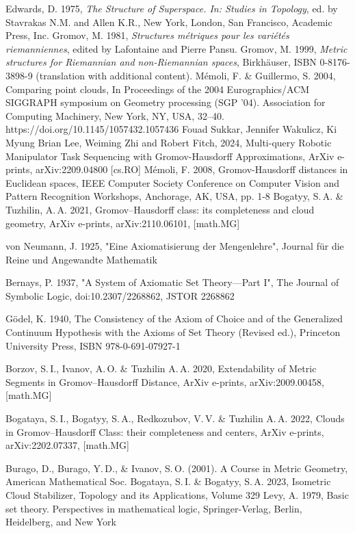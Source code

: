 \documentclass[11pt,twoside,draft
]{article}
\begin{document}
\begin{engbibliography}{99}
    
     Edwards, D. 1975, \emph{The Structure of Superspace. In: Studies in Topology}, ed. by Stavrakas N.M. and Allen K.R., New York, London, San Francisco, Academic Press, Inc.
 Gromov, M. 1981, \emph{Structures m\'etriques pour les vari\'et\'es riemanniennes}, edited by Lafontaine and Pierre Pansu.
 Gromov, M. 1999, \emph{Metric structures for Riemannian and non-Riemannian spaces}, Birkh\"auser, ISBN 0-8176-3898-9 (translation with additional content).
Mémoli, F. \& Guillermo, S. 2004, Comparing point clouds, In Proceedings of the 2004 Eurographics/ACM SIGGRAPH symposium on Geometry processing (SGP '04). Association for Computing Machinery, New York, NY, USA, 32–40. https://doi.org/10.1145/1057432.1057436
 Fouad Sukkar, Jennifer Wakulicz, Ki Myung Brian Lee, Weiming Zhi and Robert Fitch, 2024, Multi-query Robotic Manipulator Task Sequencing with Gromov-Hausdorff Approximations, ArXiv e-prints,
arXiv:2209.04800 [cs.RO]
Mémoli, F. 2008, Gromov-Hausdorff distances in Euclidean spaces, IEEE Computer Society Conference on Computer Vision and Pattern Recognition Workshops, Anchorage, AK, USA, pp. 1-8
Bogatyy, S.\,A. \& Tuzhilin, A.\,A. 2021, Gromov–Hausdorff class: its completeness and cloud geometry, ArXiv e-prints,
arXiv:2110.06101, [math.MG]

von Neumann, J. 1925, "Eine Axiomatisierung der Mengenlehre", Journal für die Reine und Angewandte Mathematik 

Bernays, P. 1937, "A System of Axiomatic Set Theory—Part I", The Journal of Symbolic Logic, doi:10.2307/2268862, JSTOR 2268862

    Gödel, K. 1940, The Consistency of the Axiom of Choice and of the Generalized Continuum Hypothesis with the Axioms of Set Theory (Revised ed.), Princeton University Press,  ISBN 978-0-691-07927-1

Borzov, S.\,I., Ivanov, A.\,O. \& Tuzhilin A.\,A. 2020, Extendability of Metric Segments in
Gromov–Hausdorff Distance, ArXiv e-prints,
arXiv:2009.00458, [math.MG] 

    Bogataya, S.\,I., Bogatyy, S.\,A., Redkozubov, V.\,V. \& Tuzhilin A.\,A. 2022, Clouds in Gromov–Hausdorff Class: their
	completeness and centers, ArXiv e-prints,
arXiv:2202.07337, [math.MG]



   Burago, D., Burago, Y.\,D., \& Ivanov, S.\,O. (2001). A Course in Metric Geometry, American Mathematical Soc.
Bogataya, S.\,I. \& Bogatyy, S.\,A. 2023, Isometric Cloud Stabilizer, Topology and its Applications,
Volume 329
Levy, A. 1979, Basic set theory. Perspectives in mathematical logic, Springer-Verlag, Berlin, Heidelberg, and New York

\end{engbibliography}

\label{end}
\end{document}
